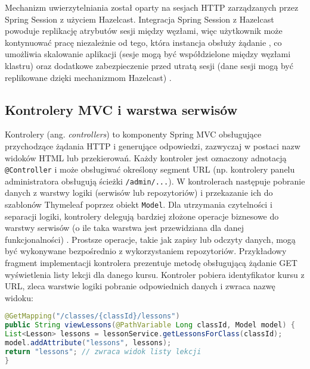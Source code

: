 \begin{itemize}
\end{itemize} Mechanizm uwierzytelniania został oparty na sesjach HTTP zarządzanych przez Spring Session z użyciem Hazelcast. Integracja Spring Session z Hazelcast powoduje replikację atrybutów sesji między węzłami, więc użytkownik może kontynuować pracę niezależnie od tego, która instancja obsłuży żądanie \cite{hazelcast-docs}, co umożliwia skalowanie aplikacji (sesje mogą być współdzielone między węzłami klastru) oraz dodatkowe zabezpieczenie przed utratą sesji (dane sesji mogą być replikowane dzięki mechanizmom Hazelcast) \cite{microservices}. \subsection{Kontrolery MVC i warstwa serwisów} Kontrolery (ang. \emph{controllers}) to komponenty Spring MVC obsługujące przychodzące żądania HTTP i generujące odpowiedzi, zazwyczaj w postaci nazw widoków HTML lub przekierowań. Każdy kontroler jest oznaczony adnotacją \texttt{@Controller} i może obsługiwać określony segment URL (np. kontrolery panelu administratora obsługują ścieżki \texttt{/admin/...}). W kontrolerach następuje pobranie danych z warstwy logiki (serwisów lub repozytoriów) i przekazanie ich do szablonów Thymeleaf poprzez obiekt \texttt{Model}. Dla utrzymania czytelności i separacji logiki, kontrolery delegują bardziej złożone operacje biznesowe do warstwy serwisów (o ile taka warstwa jest przewidziana dla danej funkcjonalności) \cite{microservices}. Prostsze operacje, takie jak zapisy lub odczyty danych, mogą być wykonywane bezpośrednio z wykorzystaniem repozytoriów. Przykładowy fragment implementacji kontrolera prezentuje metodę obsługującą żądanie GET wyświetlenia listy lekcji dla danego kursu. Kontroler pobiera identyfikator kursu z URL, zleca warstwie logiki pobranie odpowiednich danych i zwraca nazwę widoku: \begin{lstlisting}[language=Java,
  caption={Widok listy lekcji. Źródło: opracowanie własne},
  label={lst:view-lessons},
  captionpos=b]
@GetMapping("/classes/{classId}/lessons")
public String viewLessons(@PathVariable Long classId, Model model) {
List<Lesson> lessons = lessonService.getLessonsForClass(classId);
model.addAttribute("lessons", lessons);
return "lessons"; // zwraca widok listy lekcji
}

\end{lstlisting}
